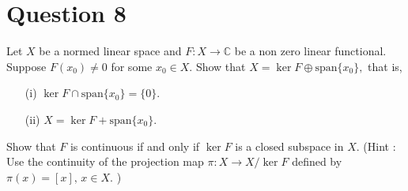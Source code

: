 \section{Question 8}
\horz
Let $X$ be a normed linear space and $F: X \to \mathbb C$ be a non zero linear functional. Suppose $F(x_0) \neq 0$ for some $x_0\in X.$ Show that $X= \ker F \oplus \mbox{span} \{x_0\},$ that is,
\begin{itemize}
\item[(i)] $\ker F \cap \mbox{span} \{x_0\} = \{0\}.$
\item[(ii)] $ X = \ker F + \mbox{span} \{x_0\}.$
\end{itemize}
Show that $F$ is continuous if and only if $\ker F$ is a closed subspace in $X.$ (Hint : Use the continuity of the projection map $\pi:X \to  X/\ker F$ defined by $\pi(x) = [x],\,x\in X.$ )
\horz
